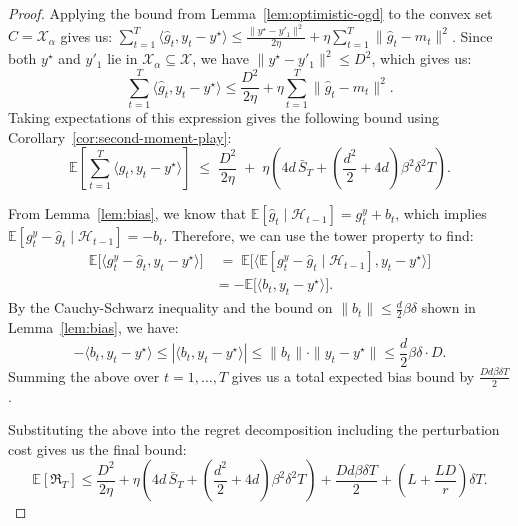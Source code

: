 \documentclass[journal,onecolumn]{IEEEtran}
\newcommand{\cX}{\mathcal{X}}
\theoremstyle{plain}
\theoremstyle{definition}
\theoremstyle{remark}
\newcommand{\regret}{\mathfrak{R}}
\begin{document}
{\begin{proof}
    Applying the bound from Lemma~\ref{lem:optimistic-ogd} to the convex set $C=\cX_{\alpha}$ gives us: $\sum_{t=1}^{T}\langle \hat g_{t}, y_{t}-y^{\star}\rangle \le \frac{\|y^{\star}-y'_{1}\|^{2}}{2\eta}+ \eta\sum_{t=1}^{T}\|\hat g_{t}-m_{t}\|^{2}$.
    Since both $y^{\star}$ and $y'_{1}$ lie in $\cX_{\alpha}\subseteq \cX$, we have
    $\|y^{\star}-y'_{1}\|^{2}\le D^{2}$, which gives us:
    \begin{equation*}
        \sum_{t=1}^{T}\langle \hat g_{t}, y_{t}-y^{\star}\rangle\le \frac{D^{2}}{2\eta}
        + \eta\sum_{t=1}^{T}\|\hat g_{t}-m_{t}\|^{2}.
    \end{equation*}
    Taking expectations of this expression gives the following bound using Corollary~\ref{cor:second-moment-play}:
    \begin{equation*}
    \mathbb{E}\left[\sum_{t=1}^{T}\langle \hat g_{t}, y_{t}-y^{\star}\rangle\right] \;\le\; \frac{D^{2}}{2\eta}\;+\; \eta\left(4d\,\bar S_{T}+ \left(\frac{d^{2}}{2}+4d\right)\beta^{2}\delta^{2}T\right).
    \end{equation*}

    From Lemma~\ref{lem:bias}, we know that
    $\mathbb{E}[\hat g_{t}\mid \mathcal{H}_{t-1}] = g_{t}^{y}+ b_{t}$, which implies
    $\mathbb{E}[g_{t}^{y}- \hat g_{t}\mid \mathcal{H}_{t-1}] = -b_{t}$. Therefore, we can use the tower property to find:
    \begin{align*}
        \mathbb{E}\big[\langle g_{t}^{y}-\hat g_{t}, y_{t}-y^{\star}\rangle\big] & \;=\; \mathbb{E}\Big[\big\langle \mathbb{E}[g_{t}^{y}-\hat g_{t}\mid \mathcal{H}_{t-1}],  y_{t}-y^{\star}\big\rangle\Big] \\
        & = -\mathbb{E}\big[\langle b_{t}, y_{t}-y^{\star}\rangle\big].
    \end{align*}
    By the Cauchy-Schwarz inequality and the bound on
    $\|b_{t}\| \le \frac{d}{2}\beta\delta$ shown in Lemma~\ref{lem:bias}, we have:
    \begin{equation*}
        -\langle b_{t}, y_{t}-y^{\star}\rangle \leq |\langle b_{t}, y_{t}-y^{\star}\rangle|\leq \|b_{t}\| \cdot \|y_{t}-y^{\star}
        \| \le \frac{d}{2}\beta\delta \cdot D.
    \end{equation*}
    Summing the above over $t=1,\dots,T$  gives us a total expected bias bound by $\frac{Dd\beta\delta
    T}{2}$.

    Substituting the above into the regret decomposition including the perturbation cost gives us the final bound:
    \begin{equation*}
        \mathbb{E}[\regret_{T}]\le\frac{D^{2}}{2\eta}+\eta\left( 4d\,\bar S_{T}+
        \left(\frac{d^{2}}{2}+4d\right)\beta^{2}\delta^{2}T \right) +\frac{Dd\beta\delta
        T}{2}+\left(L+\frac{LD}{r}\right)\delta T. \label{eq:main-exp-bound}
    \end{equation*}
\end{proof}

}
\end{document}
